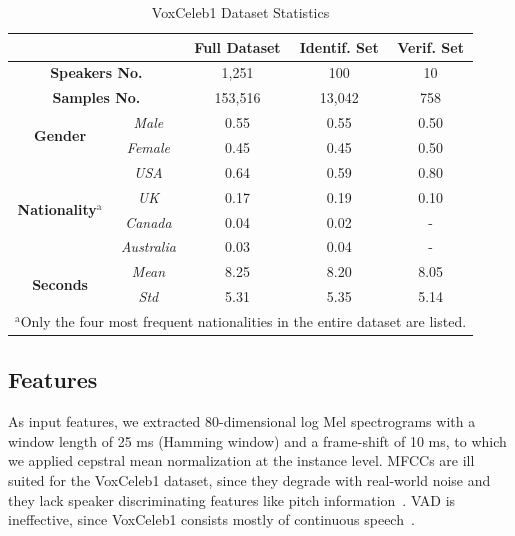 \documentclass[conference]{IEEEtran}
\begin{document}
\begin{table}[htbp]
    \caption{VoxCeleb1 Dataset Statistics}
    \begin{center}
        \begin{tabular}{|c|c|c|c|c|}
        \cline{3-5}
        \multicolumn{2}{c|}{\textbf{}} & \textbf{Full Dataset} & \textbf{Identif. Set} & \textbf{Verif. Set}\\
        \hline
        \multicolumn{2}{|c|}{\textbf{Speakers No.}} & 1,251 & 100 & 10\\
        \hline
        \multicolumn{2}{|c|}{\textbf{Samples No.}} & 153,516 & 13,042 & 758 \\
        \hline
        \multirow{2}{*}{\textbf{Gender}} & \textit{Male} & 0.55 & 0.55 & 0.50 \\
        & \textit{Female} & 0.45 & 0.45 & 0.50 \\
        \hline
        \multirow{4}{*}{\textbf{Nationality}$^{\mathrm{a}}$} & \textit{USA} & 0.64 & 0.59 & 0.80 \\
        & \textit{UK} & 0.17 & 0.19 & 0.10 \\
        & \textit{Canada} & 0.04 & 0.02 & - \\
        & \textit{Australia} & 0.03 & 0.04 & - \\
        \hline
        \multirow{2}{*}{\textbf{Seconds}} & \textit{Mean} & 8.25 & 8.20 & 8.05 \\
        & \textit{Std} & 5.31 & 5.35 & 5.14 \\
        \hline
        \multicolumn{5}{l}{$^{\mathrm{a}}$Only the four most frequent nationalities in the entire dataset are listed.}
        \end{tabular}
        \label{tab:dataset}
    \end{center}
\end{table}

\subsection{Features}

As input features, we extracted 80-dimensional log Mel spectrograms with a window length of 25 ms (Hamming window) and a frame-shift of 10 ms, to which we applied cepstral mean normalization at the instance level. MFCCs are ill suited for the VoxCeleb1 dataset, since they degrade with real-world noise and they lack speaker discriminating features like pitch information~\cite{nagrani2020voxceleb}. VAD is ineffective, since VoxCeleb1 consists mostly of continuous speech~\cite{chung2020defence}.
\end{document}
